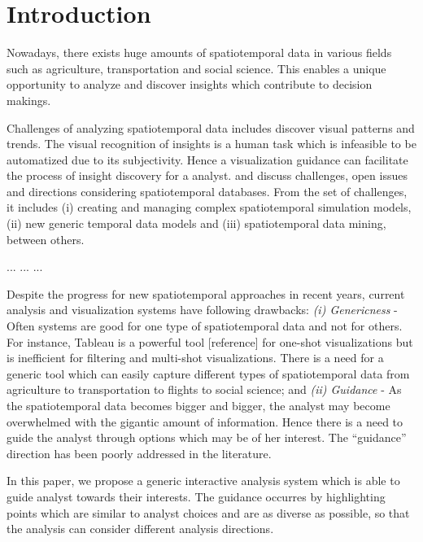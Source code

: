 \section{Introduction}\label{sec:intro}

Nowadays, there exists huge amounts of spatiotemporal data in various fields such as agriculture, transportation and social science. This enables a unique opportunity to analyze and discover insights which contribute to decision makings. 

Challenges of analyzing spatiotemporal data includes discover visual patterns and trends. The visual recognition of insights is a human task which is infeasible to be automatized due to its subjectivity. Hence a visualization guidance can facilitate the process of insight discovery for a analyst. \cite{RoddickEHPS04} and \cite{Telang:2012} discuss challenges, open issues and directions considering spatiotemporal databases. From the set of challenges, it includes (i) creating and managing complex spatiotemporal simulation models, (ii) new generic temporal data models and (iii) spatiotemporal data mining, between others. 

...
...
...

Despite the progress for new spatiotemporal approaches in recent years, current analysis and visualization systems have following drawbacks: \textit{(i) Genericness} - Often systems are good for one type of spatiotemporal data and not for others. For instance, Tableau is a powerful tool [reference] for one-shot visualizations but is inefficient for filtering and multi-shot visualizations. There is a need for a generic tool which can easily capture different types of spatiotemporal data from agriculture to transportation to flights to social science; and \textit{(ii) Guidance} - As the spatiotemporal data becomes bigger and bigger, the analyst may become overwhelmed with the gigantic amount of information. Hence there is a need to guide the analyst through options which may be of her interest. The “guidance” direction has been poorly addressed in the literature.


In this paper, we propose a generic interactive analysis system which is able to guide analyst towards their interests. The guidance occurres by highlighting points which are similar to analyst choices and are as diverse as possible, so that the analysis can consider different analysis directions.

 
